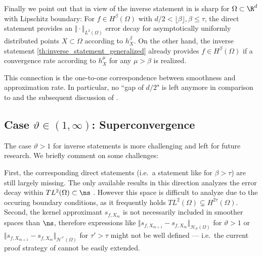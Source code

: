 \documentclass[a4paper, 10pt]{article}
\newcommand{\Ht}{\mathcal{H}_{\vartheta}}
\begin{document}
%




%
%
%
%

Finally we point out that in view of  the inverse statement in  is sharp for $\Omega \subset \R^d$ with Lipschitz boundary:
For $f \in H^\beta(\Omega)$ with $d/2 < \lfloor \beta \rfloor, \beta \leq \tau$, 
the direct statement  provides an $\Vert \cdot \Vert_{L^2(\Omega)}$ error decay for asymptotically uniformly distributed points $X \subset \Omega$ according to $h_{X}^\beta$.
On the other hand, the inverse statement \ref{th:inverse_statement_generalized} already provides $f \in H^\beta(\Omega)$ if a convergence rate according to $h_{X}^\mu$ for any $\mu > \beta$ is realized. 

This connection is the one-to-one correspondence between smoothness and approximation rate.
In particular, no ``gap of $d/2$" is left anymore in comparison to  and the subsequent discussion of .





\subsection{Case $\vartheta \in (1, \infty)$: Superconvergence} \label{subsec:vartheta_case_2}

The case $\vartheta > 1$ for inverse statements is more challenging and left for future research.
We briefly comment on some challenges:

First, the corresponding direct statements (i.e.\ a statement like  for $\beta > \tau$) are still largely missing.
The only available results in this direction analyzes the error decay within $TL^2(\Omega) \subset \ns$ \cite{schaback2018superconvergence}.
However this space is difficult to analyze due to the occuring boundary conditions, as it frequently holds $TL^2(\Omega) \subsetneq H^{2\tau}(\Omega)$.
Second, the kernel approximant $s_{f, X_m}$ is not necessarily included in smoother spaces than $\ns$, 
therefore expressions like $\Vert s_{f, X_{m+1}} - s_{f, X_{m}} \Vert_{\Ht(\Omega)}$ for $\vartheta > 1$ or $\Vert s_{f, X_{m+1}} - s_{f, X_{m}} \Vert_{\mathcal{H}^{\tau'}(\Omega)}$ for $\tau' > \tau$ might not be well defined 
--- i.e.\ the current proof strategy of  cannot be easily extended.
\end{document}
